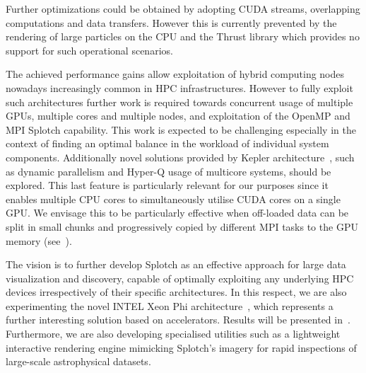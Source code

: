 \documentclass[preprint,5pt]{elsarticle}
\begin{document}
Further optimizations could be obtained by adopting CUDA streams, overlapping computations and data transfers. However this is currently prevented by the rendering of large particles on the CPU and the Thrust library which provides no support for such operational scenarios.

The achieved performance gains allow exploitation of hybrid computing nodes nowadays increasingly common in HPC infrastructures. However to fully exploit such architectures further work is required towards concurrent usage of multiple GPUs, multiple cores and multiple nodes, and exploitation of the OpenMP and MPI Splotch capability. This work is expected to be challenging especially in the context of finding an optimal balance in the workload of individual system components. Additionally novel solutions provided by Kepler architecture~\cite{GK110}, such as dynamic parallelism and Hyper-Q usage of multicore systems, should be explored. This last feature is particularly relevant for our purposes since it enables multiple CPU cores to simultaneously utilise CUDA cores on a single GPU. We envisage this to be particularly effective when off-loaded data can be split in small chunks and progressively copied by different MPI tasks to the GPU memory (see~\cite{GPUTech}). 


The vision is to further develop Splotch as an effective approach for large data visualization and discovery, capable of optimally exploiting any underlying HPC devices irrespectively of their specific architectures. In this respect, we are also experimenting the novel INTEL Xeon Phi
architecture~\cite{mic}, which represents a further interesting solution based on accelerators. Results will be presented in~\cite{mic-splotch}.
Furthermore, we are also developing specialised utilities such as a lightweight interactive rendering engine mimicking Splotch's imagery for rapid inspections of large-scale astrophysical datasets.


	
\end{document}
